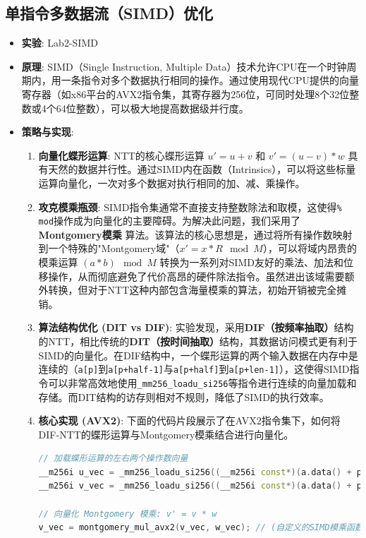 \documentclass[a4paper]{article}
\begin{document}
\subsection{单指令多数据流（SIMD）优化}
\begin{itemize}
    \item \textbf{实验}: Lab2-SIMD
    \item \textbf{原理}: SIMD（Single Instruction, Multiple Data）技术允许CPU在一个时钟周期内，用一条指令对多个数据执行相同的操作。通过使用现代CPU提供的向量寄存器（如x86平台的AVX2指令集，其寄存器为256位，可同时处理8个32位整数或4个64位整数），可以极大地提高数据级并行度。
    \item \textbf{策略与实现}:
    \begin{enumerate}
        \item \textbf{向量化蝶形运算}: NTT的核心蝶形运算 $u' = u + v$ 和 $v' = (u - v) * w$ 具有天然的数据并行性。通过SIMD内在函数（Intrinsics），可以将这些标量运算向量化，一次对多个数据对执行相同的加、减、乘操作。
        \item \textbf{攻克模乘瓶颈}: SIMD指令集通常不直接支持整数除法和取模，这使得\texttt{\% mod}操作成为向量化的主要障碍。为解决此问题，我们采用了 \textbf{Montgomery模乘} 算法。该算法的核心思想是，通过将所有操作数映射到一个特殊的"Montgomery域"（$x' = x * R \mod M$），可以将域内昂贵的模乘运算 $(a * b) \mod M$ 转换为一系列对SIMD友好的乘法、加法和位移操作，从而彻底避免了代价高昂的硬件除法指令。虽然进出该域需要额外转换，但对于NTT这种内部包含海量模乘的算法，初始开销被完全摊销。
        \item \textbf{算法结构优化 (DIT vs DIF)}: 实验发现，采用\textbf{DIF（按频率抽取）}结构的NTT，相比传统的\textbf{DIT（按时间抽取）}结构，其数据访问模式更有利于SIMD的向量化。在DIF结构中，一个蝶形运算的两个输入数据在内存中是连续的（\texttt{a[p]}到\texttt{a[p+half-1]}与\texttt{a[p+half]}到\texttt{a[p+len-1]}），这使得SIMD指令可以非常高效地使用\texttt{\_mm256\_loadu\_si256}等指令进行连续的向量加载和存储。而DIT结构的访存则相对不规则，降低了SIMD的执行效率。
        \item \textbf{核心实现 (AVX2)}: 下面的代码片段展示了在AVX2指令集下，如何将DIF-NTT的蝶形运算与Montgomery模乘结合进行向量化。
        \begin{lstlisting}[language=C++]
// 加载蝶形运算的左右两个操作数向量
__m256i u_vec = _mm256_loadu_si256((__m256i const*)(a.data() + p));
__m256i v_vec = _mm256_loadu_si256((__m256i const*)(a.data() + p + half));

// 向量化 Montgomery 模乘: v' = v * w
v_vec = montgomery_mul_avx2(v_vec, w_vec); // (自定义的SIMD模乘函数)


\end{lstlisting}
\end{enumerate}
\end{itemize}
\end{document}

